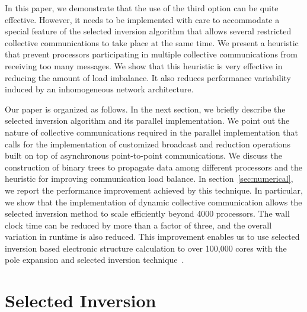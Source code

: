 \documentclass{acm_proc_article-sp}
\begin{document}
In this paper, we demonstrate that the use of the third option can be
quite effective.  However, it needs to be implemented with care
to accommodate a special feature of the selected inversion 
algorithm that allows several restricted collective communications 
to take place at the same time. We present a heuristic that prevent
processors participating in multiple collective communications
from receiving too many messages. We show that this heuristic is
very effective in reducing the amount of load imbalance. 
It also reduces performance variability induced by an inhomogeneous 
network architecture. 


Our paper is organized as follows. In the next section, we 
briefly describe the selected inversion algorithm and its
parallel implementation. We point out the nature of
collective communications required in the parallel implementation
that calls for the implementation of customized broadcast and
reduction operations built on top of asynchronous 
point-to-point communications. We discuss the construction of 
binary trees to propagate data among different processors and
the heuristic for improving communication load balance.
In section~\ref{sec:numerical}, we report the performance improvement
achieved by this technique.
In particular, we show that the implementation of dynamic collective
communication allows the selected inversion method
to scale efficiently beyond 4000 processors.  
The wall clock time can be reduced by more than a factor of three, and the
overall variation in runtime is also reduced.  This improvement
enables us to use selected inversion based electronic structure 
calculation to over 100,000 cores with the pole expansion and selected 
inversion technique~\cite{LinLuYingCarE2009,LinChenYangEtAl2013}.   



\section{Selected Inversion}\label{sec:prelim}
\end{document}
